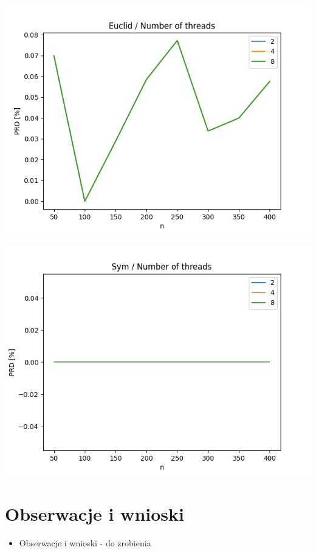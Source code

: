 \documentclass{article}
\begin{document}
\begin{center}
\includegraphics[width=\textwidth, 
                   height = 0.4\textheight, 
                   keepaspectratio]
                  {plots/euclid_12_num_of_threads} 
\end{center}

\begin{center}
\includegraphics[width=\textwidth, 
                   height = 0.4\textheight, 
                   keepaspectratio]
                  {plots/sym_12_num_of_threads} 
\end{center}



\section{Obserwacje i wnioski}
\begin{itemize}
\item Obserwacje i wnioski - do zrobienia
\end{itemize}
\end{document}
